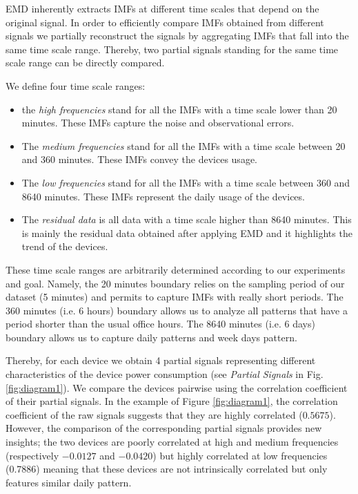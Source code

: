 EMD inherently extracts IMFs at different time scales that depend on the original signal.
In order to efficiently compare IMFs obtained from different signals we partially reconstruct the signals by aggregating IMFs that fall into the same time scale range.
Thereby, two partial signals standing for the same time scale range can be directly compared.

We define four time scale ranges: 
\begin{itemize}
 \item the \emph{high frequencies} stand for all the IMFs with a time scale lower than 20 minutes. These IMFs capture the noise and observational errors.
 \item The \emph{medium frequencies} stand for all the IMFs with a time scale between 20 and 360 minutes. These IMFs convey the devices usage.
 \item The \emph{low frequencies} stand for all the IMFs with a time scale between 360 and 8640 minutes. These IMFs represent the daily usage of the devices.
 \item The \emph{residual data} is all data with a time scale higher than 8640 minutes. This is mainly the residual data obtained after applying EMD and it highlights the trend of the devices.
\end{itemize}

These time scale ranges are arbitrarily determined according to our experiments and goal.
Namely, the 20 minutes boundary relies on the sampling period of our dataset (5 minutes) and permits to capture IMFs with really short periods.
The 360 minutes (i.e. 6 hours) boundary allows us to analyze all patterns that have a period shorter than the usual office hours.
The 8640 minutes (i.e. 6 days) boundary allows us to capture daily patterns and week days pattern.

Thereby, for each device we obtain 4 partial signals representing different characteristics of the device power consumption (see \emph{Partial Signals} in Fig.\ref{fig:diagram1}).
We compare the devices pairwise using the correlation coefficient of their partial signals.
In the example of Figure \ref{fig:diagram1}, the correlation coefficient of the raw signals suggests that they are highly correlated ($0.5675$). 
However, the comparison of the corresponding partial signals provides new insights;
the two devices are poorly correlated at high and medium frequencies (respectively $-0.0127$ and $-0.0420$) but highly correlated at low frequencies (0.7886) meaning that these devices are not intrinsically correlated but only features similar daily pattern.


